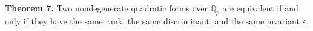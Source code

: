 \textbf{Theorem 7.} Two nondegenerate quadratic forms over $\mathbb{Q}_p$ are equivalent if and only if they have the same rank, the same discriminant, and the same invariant $\varepsilon$.
